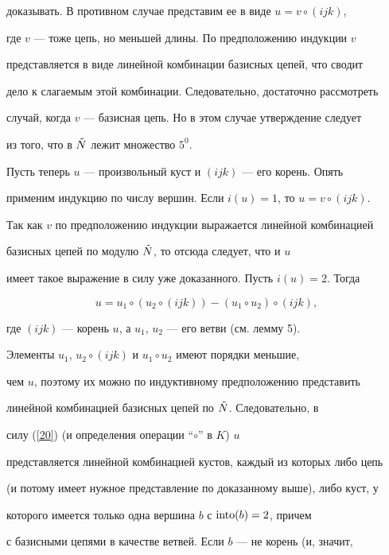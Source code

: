 \begin{pf}
доказывать. В противном случае представим ее в виде $u=v\circ (ijk)$,


где $v$ --- тоже цепь, но меньшей длины. По предположению индукции $v$


представляется в виде линейной комбинации базисных цепей, что сводит


дело к слагаемым этой комбинации. Следовательно, достаточно рассмотреть


случай, когда $v$ --- базисная цепь. Но в этом случае утверждение следует


из того, что в $\Tilde N$ лежит множество $5^0$.





Пусть теперь $u$ --- произвольный куст и $(ijk)$ --- его корень. Опять


применим индукцию по числу вершин. Если $i(u)=1$, то ${u=v\circ (ijk)}$.


Так как $v$ по предположению индукции выражается линейной комбинацией


базисных цепей по модулю $\Tilde N$, то отсюда следует, что и $u$


имеет такое выражение в силу уже доказанного. Пусть $i(u)=2$. Тогда


\begin{equation}\label{20}


u=u_1\circ (u_2\circ (ijk))-(u_1\circ u_2)\circ (ijk),


\end{equation}


где $(ijk)$ --- корень $u$, а $u_1$, $u_2$ --- его ветви (см. лемму 5).


Элементы $u_1$, $u_2\circ (ijk)$ и $u_1\circ u_2$ имеют порядки меньшие,


чем $u$, поэтому их можно по индуктивному предположению представить


линейной комбинацией базисных цепей по $\Tilde N$. Следовательно, в


силу (\ref{20}) (и определения операции ``$\circ$'' в $K$) $u$


представляется линейной комбинацией кустов, каждый из которых либо цепь


(и потому имеет нужное представление по доказанному выше), либо куст, у


которого имеется только одна вершина $b$ с $\operatorname{into} (b)=2$, причем


с базисными цепями в качестве ветвей. Если $b$ --- не корень (и, значит,



\end{pf}
